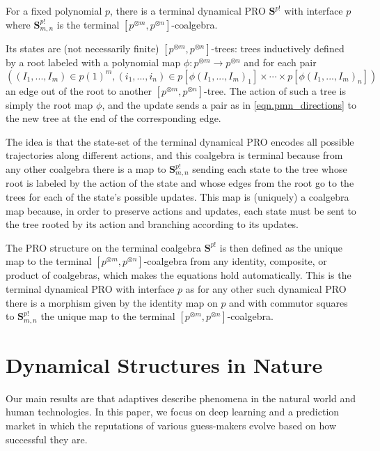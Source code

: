 \documentclass[11pt, one side, article]{memoir}
\theoremstyle{definition}
\theoremstyle{plain}
\newenvironment{example}
  {\pushQED{\qed}\renewcommand{\qedsymbol}{$\lozenge$}\examplex}
  {\popQED\endexamplex}
\newcommand{\Cat}[1]{\mathbf{#1}}%
\newcommand{\0}{\textsf{0}}
\newcommand{\1}{\tn{\textsf{1}}}
\renewcommand{\S}{{\Cat{S}}}
\begin{document}
\begin{example}
For a fixed polynomial $p$, there is a terminal dynamical PRO $\S^{p!}$ with interface $p$ where $\S^{p!}_{m,n}$ is the terminal $[p^{\otimes m},p^{\otimes n}]$-coalgebra. 

Its states are (not necessarily finite) $[p^{\otimes m},p^{\otimes n}]$-trees: trees inductively defined by a root labeled with a polynomial map $\phi : p^{\otimes m} \to p^{\otimes n}$ and for each pair 
\begin{equation}\label{eqn.pmn_directions}
\left((I_1,...,I_m) \in p(1)^m, (i_1,...,i_n) \in p[\phi(I_1,...,I_m)_1] \times \cdots \times p[\phi(I_1,...,I_m)_n]\right)
\end{equation}
an edge out of the root to another $[p^{\otimes m},p^{\otimes n}]$-tree. The action of such a tree is simply the root map $\phi$, and the update sends a pair as in \eqref{eqn.pmn_directions} to the new tree at the end of the corresponding edge. 

The idea is that the state-set of the terminal dynamical PRO encodes all possible trajectories along different actions, and this coalgebra is terminal because from any other coalgebra there is a map to $\S^{p!}_{m,n}$ sending each state to the tree whose root is labeled by the action of the state and whose edges from the root go to the trees for each of the state's possible updates. This map is (uniquely) a coalgebra map because, in order to preserve actions and updates, each state must be sent to the tree rooted by its action and branching according to its updates.

The PRO structure on the terminal coalgebra $\S^{p!}$ is then defined as the unique map to the terminal $[p^{\otimes m},p^{\otimes n}]$-coalgebra from any identity, composite, or product of coalgebras, which makes the equations hold automatically. This is the terminal dynamical PRO with interface $p$ as for any other such dynamical PRO there is a morphism given by the identity map on $p$ and with commutor squares to $\S^{p!}_{m,n}$ the unique map to the terminal $[p^{\otimes m},p^{\otimes n}]$-coalgebra.
\end{example}



\chapter{Dynamical Structures in Nature}
%

Our main results are that adaptives describe phenomena in the natural world and human technologies. In this paper, we focus on deep learning and a prediction market in which the reputations of various guess-makers evolve based on how successful they are.
\end{document}

